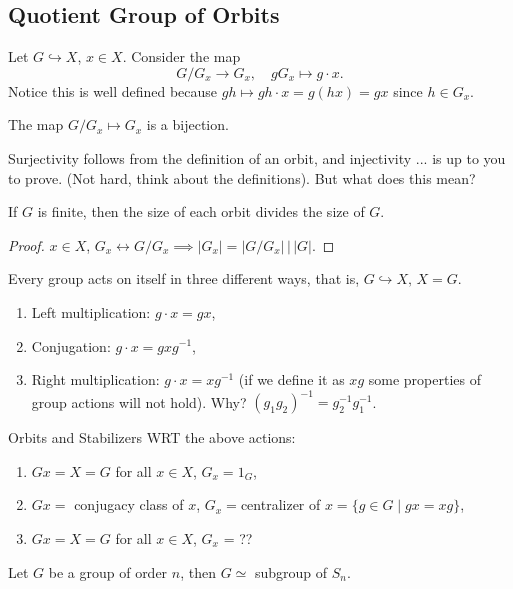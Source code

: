 \subsection{Quotient Group of Orbits}
Let $G \hookrightarrow X$, $x\in X$. Consider the map \[
G/G_x \to G_x, \quad gG_x \mapsto g\cdot x.
\]
Notice this is well defined because $gh \mapsto gh\cdot x = g(hx)=gx$ since $h\in G_x$.

\begin{claim}
    The map $G/G_x \mapsto G_x$ is a bijection.
\end{claim}
Surjectivity follows from the definition of an orbit, and injectivity ... is up to you to prove. (Not hard, think about the definitions). But what does this mean?
\begin{prop}
    If $G$ is finite, then the size of each orbit divides the size of $G$. 
\end{prop}
\begin{proof}
    $x\in X$, $G_x \leftrightarrow G/G_x \implies |G_x|=|G/G_x| \, \big| \, |G|$.
\end{proof}
\begin{example}
    Every group acts on itself in three different ways, that is, $G \hookrightarrow X, \, X=G$.
    \begin{enumerate}
        \item Left multiplication: $g\cdot x=gx$,
        \item Conjugation: $g\cdot x=gxg^{-1}$,
        \item Right multiplication: $g\cdot x=xg^{-1}$ (if we define it as $xg$ some properties of group actions will not hold). Why? $(g_1g_2)^{-1}=g_2^{-1}g_1^{-1}$.
    \end{enumerate}
    Orbits and Stabilizers WRT the above actions: 
    \begin{enumerate}
        \item $Gx=X=G$ for all $x\in X$, $G_x={1_G}$,
        \item  $Gx=$ conjugacy class of $x$, $G_x=$centralizer of $x = \{g\in G \mid gx=xg\} $,
        \item $Gx=X=G$ for all $x\in X$, $G_x$ = ??
    \end{enumerate}
\end{example}
\begin{prop}
    Let $G$ be a group of order $n$, then $G \simeq $ subgroup of $S_n$.
\end{prop}
